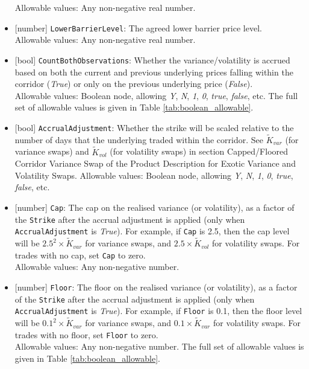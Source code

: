 \begin{itemize}
  Allowable values: Any non-negative real number.
  \item{}[number] \lstinline!LowerBarrierLevel!: The agreed lower barrier price level. \\
  Allowable values: Any non-negative real number.
  \item{}[bool] \lstinline!CountBothObservations!: Whether the variance/volatility is accrued based on both the current and
  previous underlying prices falling within the corridor (\emph{True}) or only on the previous underlying price
  (\emph{False}). \\
  Allowable values: Boolean node, allowing \emph{Y}, \emph{N}, \emph{1}, \emph{0}, \emph{true}, \emph{false}, etc.
  The full set of allowable values is given in Table \ref{tab:boolean_allowable}.
  \item{}[bool] \lstinline!AccrualAdjustment!: Whether the strike will be scaled relative to the number of days that the
  underlying traded within the corridor. See $\widetilde{K}_{var}$ (for variance swaps) and $\widetilde{K}_{vol}$
  (for volatility swaps) in section Capped/Floored Corridor Variance Swap of the Product Description for
  Exotic Variance and Volatility Swaps.
  Allowable values: Boolean node, allowing \emph{Y}, \emph{N}, \emph{1}, \emph{0}, \emph{true}, \emph{false}, etc.
  \item{}[number] \lstinline!Cap!: The cap on the realised variance (or volatility), as a factor of the \lstinline!Strike! after
  the accrual adjustment is applied (only when \lstinline!AccrualAdjustment! is \emph{True}). For example,
  if \lstinline!Cap! is 2.5, then the cap level will be $2.5^2 \times \widetilde{K}_{var}$ for variance swaps, and
  $2.5 \times \widetilde{K}_{vol}$ for volatility swaps. For trades with no cap, set \lstinline!Cap! to zero. \\
  Allowable values: Any non-negative number.
  \item{}[number] \lstinline!Floor!: The floor on the realised variance (or volatility), as a factor of the \lstinline!Strike! after
  the accrual adjustment is applied (only when \lstinline!AccrualAdjustment! is \emph{True}). For example,
  if \lstinline!Floor! is 0.1, then the floor level will be $0.1^2 \times \widetilde{K}_{var}$ for variance swaps, and
  $0.1 \times \widetilde{K}_{var}$ for volatility swaps. For trades with no floor, set
  \lstinline!Floor! to zero. \\
  Allowable values: Any non-negative number.
  The full set of allowable values is given in Table \ref{tab:boolean_allowable}.

\end{itemize}
